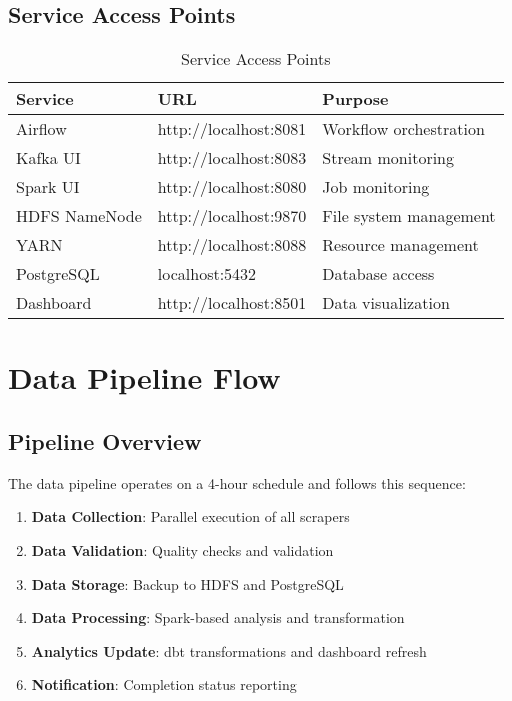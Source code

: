\documentclass[12pt,a4paper]{article}
\begin{document}
\subsection{Service Access Points}

\begin{table}[H]
\centering
\begin{tabular}{|l|l|l|}
\hline
\textbf{Service} & \textbf{URL} & \textbf{Purpose} \\
\hline
Airflow & http://localhost:8081 & Workflow orchestration \\
\hline
Kafka UI & http://localhost:8083 & Stream monitoring \\
\hline
Spark UI & http://localhost:8080 & Job monitoring \\
\hline
HDFS NameNode & http://localhost:9870 & File system management \\
\hline
YARN & http://localhost:8088 & Resource management \\
\hline
PostgreSQL & localhost:5432 & Database access \\
\hline
Dashboard & http://localhost:8501 & Data visualization \\
\hline
\end{tabular}
\caption{Service Access Points}
\label{tab:service-access}
\end{table}

\section{Data Pipeline Flow}

\subsection{Pipeline Overview}
The data pipeline operates on a 4-hour schedule and follows this sequence:

\begin{enumerate}
    \item \textbf{Data Collection}: Parallel execution of all scrapers
    \item \textbf{Data Validation}: Quality checks and validation
    \item \textbf{Data Storage}: Backup to HDFS and PostgreSQL
    \item \textbf{Data Processing}: Spark-based analysis and transformation
    \item \textbf{Analytics Update}: dbt transformations and dashboard refresh
    \item \textbf{Notification}: Completion status reporting
\end{enumerate}
\end{document}
